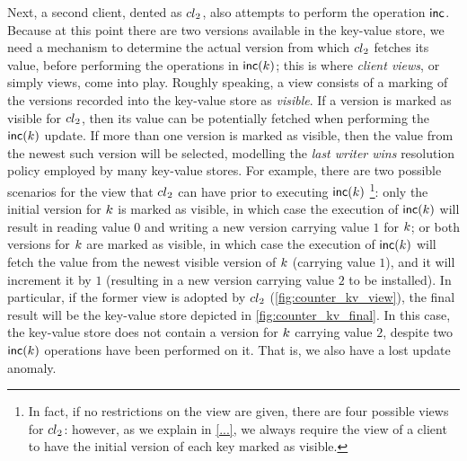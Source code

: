Next, a second client, dented as ${cl}_2$, also attempts to perform the operation $\mathsf{inc}$. Because 
at this point there are two versions available in the key-value store, we need a mechanism to determine 
the actual version from which ${cl}_2$ fetches its value, before performing the operations in $\mathsf{inc}(k)$; 
this is where \emph{client views}, or simply views, come into play. Roughly speaking, a view consists of 
a marking of the versions recorded into the key-value store as \emph{visible}. If a version is marked as 
visible for ${cl}_2$, then its value can be potentially fetched when performing the $\mathsf{inc}(k)$ update. 
If more than one version is marked as visible, then the value from the newest such version will be selected, 
modelling the \emph{last writer wins} resolution policy employed by many key-value stores. 
For example, there are two possible scenarios for the view that ${cl}_2$ can have prior to executing $\mathsf{inc}(k)$
\footnote{In fact, if no restrictions on the view are given, there 
are four possible views for ${cl}_2$: however, as we explain in \cref{...}, we always require the view of a client 
to have the initial version of each key marked as visible.}: 
only the initial version for $k$ is marked as visible, in which case the execution of $\mathsf{inc}(k)$ will result 
in reading value $0$ and writing a new version carrying value $1$ for $k$; or both versions for $k$ 
are marked as visible, in which case the execution of $\mathsf{inc}(k)$ will fetch the value from  
the newest visible version of $k$ (carrying value $1$), and it will increment it by $1$ (resulting in 
a new version carrying value $2$ to be installed). In particular, if the former view is adopted by ${cl}_2$ (\cref{fig:counter_kv_view}), 
the final result will be the key-value store depicted in \cref{fig:counter_kv_final}. In this case, the 
key-value store does not contain a version for $k$ carrying value $2$, despite two $\mathsf{inc}(k)$ 
operations have been performed on it. That is, we also have a lost update anomaly.

